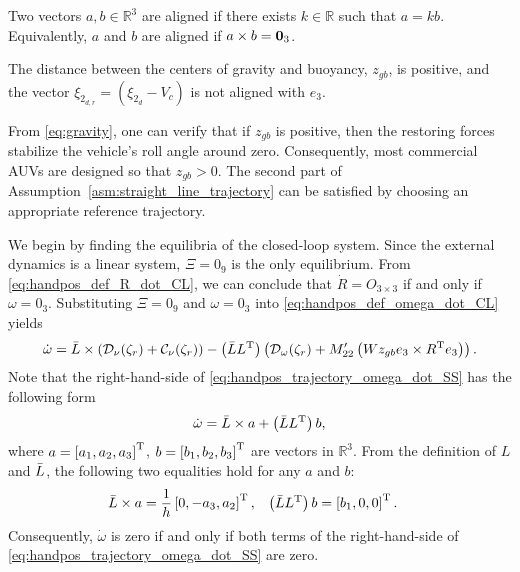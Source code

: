 \begin{dfn}
    Two vectors $a, b \in \mathbb{R}^3$ are aligned if there exists $k \in \mathbb{R}$ such that $a = kb$.
    Equivalently, $a$ and $b$ are aligned if $a \times b = \mathbf{0}_3$.
    \label{dfn:aligned}
\end{dfn}
\begin{asm}
    The distance between the centers of gravity and buoyancy, $z_{gb}$, is positive, and the vector $\xi_{2_{d, r}} = (\xi_{2_d} - V_c)$ is not aligned with $e_3$.
    \label{asm:straight_line_trajectory}
\end{asm}
\begin{rmk}
    From \eqref{eq:gravity}, one can verify that if $z_{gb}$ is positive, then the restoring forces stabilize the vehicle's roll angle around zero.
    Consequently, most commercial AUVs are designed so that $z_{gb} > 0$.
    The second part of Assumption~\ref{asm:straight_line_trajectory} can be satisfied by choosing an appropriate reference trajectory.
\end{rmk}

We begin by finding the equilibria of the closed-loop system.
Since the external dynamics is a linear system, $\Xi = 0_{9}$ is the only equilibrium.
From \eqref{eq:handpos_def_R_dot_CL}, we can conclude that $\dot{R} = O_{3 \times 3}$ if and only if $\omega = 0_3$.
Substituting $\Xi = 0_{9}$ and $\omega = 0_3$ into \eqref{eq:handpos_def_omega_dot_CL} yields
\begin{equation}
        \dot{\omega} = \Bar{L} \times \left(\mathcal{D}_{\nu}(\zeta_r) + \mathcal{C}_{\nu}(\zeta_r)\right) 
        - \left(\Bar{L}L^{\mathrm{T}}\right) \left(\mathcal{D}_{\omega}(\zeta_r) + M_{22}^{\prime}\left(Wz_{gb} e_3 \times R^{\mathrm{T}} e_3\right)\right).
    \label{eq:handpos_trajectory_omega_dot_SS}
\end{equation}
Note that the right-hand-side of \eqref{eq:handpos_trajectory_omega_dot_SS} has the following form
\begin{equation}
    \dot{\omega} = \Bar{L} \times a + \left(\Bar{L}L^{\mathrm{T}}\right) b,
\end{equation}
where $a = \left[a_1, a_2, a_3\right]^{\mathrm{T}}$, $b = \left[b_1, b_2, b_3\right]^{\mathrm{T}}$ are vectors in $\mathbb{R}^3$.
From the definition of $L$ and $\Bar{L}$, the following two equalities hold for any $a$ and $b$:
\begin{align}
    \Bar{L} \times a &= \frac{1}{h} \left[0, -a_3, a_2\right]^{\mathrm{T}}, &
    \left(\Bar{L}L^{\mathrm{T}}\right) b &= \left[b_1, 0, 0\right]^{\mathrm{T}}.
\end{align}
Consequently, $\dot{\omega}$ is zero if and only if both terms of the right-hand-side of \eqref{eq:handpos_trajectory_omega_dot_SS} are zero.

